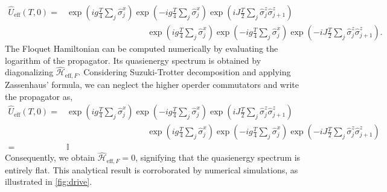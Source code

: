 \documentclass[a4paper,10pt]{article}
\begin{document}
\begin{align}
    \hat{U}_{\text{eff}}(T,0) =& 
    \exp\left(i g \frac{T}{4} \sum_{j}\hat{\sigma}_j^x\right)
    \exp\left(-i g \frac{T}{4} \sum_{j}\hat{\sigma}_j^x\right)\exp\left(i J \frac{T}{2} \sum_{j} \hat{\sigma}_j^z \hat{\sigma}_{j+1}^z\right)\nonumber\\
    &\hspace{4cm}\exp\left(i g \frac{T}{4} \sum_{j}\hat{\sigma}_j^x\right)\exp\left(-i g \frac{T}{4} \sum_{j}\hat{\sigma}_j^x\right)\exp\left(-i J \frac{T}{2} \sum_{j} \hat{\sigma}_j^z \hat{\sigma}_{j+1}^z\right).
\end{align}
The Floquet Hamiltonian can be computed numerically by evaluating the logarithm of the propagator. Its quasienergy spectrum is obtained by diagonalizing $\hat{\mathcal{H}}_{\text{eff},F}$. 
Considering Suzuki-Trotter decomposition and applying  Zassenhaus’ formula, we can neglect the higher operder commutators and write the propagator as,
\begin{align}
    \hat{U}_{\text{eff}}(T,0) =& 
        \exp\left(i g \frac{T}{4} \sum_{j}\hat{\sigma}_j^x\right)
        \exp\left(-i g \frac{T}{4} \sum_{j}\hat{\sigma}_j^x\right)\exp\left(i J \frac{T}{2} \sum_{j} \hat{\sigma}_j^z \hat{\sigma}_{j+1}^z\right)\nonumber\\
        &\hspace{4cm}\exp\left(i g \frac{T}{4} \sum_{j}\hat{\sigma}_j^x\right)\exp\left(-i g \frac{T}{4} \sum_{j}\hat{\sigma}_j^x\right)\exp\left(-i J \frac{T}{2} \sum_{j} \hat{\sigma}_j^z \hat{\sigma}_{j+1}^z\right)\nonumber\\
        =& \mathbb{I}
\end{align}
Consequently, we obtain $\hat{\mathcal{H}}_{\text{eff},F} = 0$, signifying that the quasienergy spectrum is entirely flat. This analytical result is corroborated by numerical simulations, as illustrated in \cref{fig:drive}.
\end{document}
